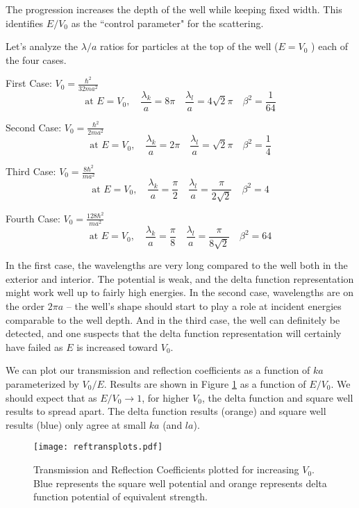 The progression increases the depth of the well while keeping fixed width. This
identifies $E/V_0$ as the ``control parameter" for the scattering. 

Let's analyze the $\lambda / a$ ratios for particles at the top of the well ($E
= V_0$ ) each of the four cases. 

\begin{subbox}{}
  First Case: $V_0 = \frac{\hbar^2}{32ma^2}$ 
  \[ \text{at } E = V_0, \quad \frac{\lambda_k}{a} = 8\pi \quad
  \frac{\lambda_l}{a} = 4\sqrt{2}\pi \quad \beta^2 = \frac{1}{64} \] 
  
  Second Case: $V_0 = \frac{\hbar^2}{2ma^2}$ 
  \[ \text{at } E = V_0, \quad \frac{\lambda_k}{a} = 2\pi \quad
    \frac{\lambda_l}{a} = \sqrt{2}\pi \quad \beta^2 = \frac{1}{4} \]

  Third Case: $V_0 = \frac{8\hbar^2}{ma^2}$
  \[ \text{at } E = V_0, \quad \frac{\lambda_k}{a} = \frac{\pi}{2} \quad
  \frac{\lambda_l}{a} = \frac{\pi}{2\sqrt{2}} \quad \beta^2 = 4 \] 

  Fourth Case: $V_0 = \frac{128\hbar^2}{ma^2}$ 
  \[ \text{at } E = V_0, \quad \frac{\lambda_k}{a} = \frac{\pi}{8} \quad
  \frac{\lambda_l}{a} = \frac{\pi}{8\sqrt{2}} \quad \beta^2 = 64\]
\end{subbox}


In the first case, the wavelengths are very long compared to the well both in
the exterior and interior. The potential is weak, and the delta function
representation might work well up to fairly high energies. In the second case,
wavelengths are on the order $2\pi a$ -- the well's shape should start to play
a role at incident energies comparable to the well depth. And in the third
case, the well can definitely be detected, and one suspects that the delta
function representation will certainly have failed as $E$ is increased toward
$V_0$. 

We can plot our transmission and reflection coefficients as a function of $ka$
parameterized by $V_0 / E$. Results are shown in Figure \ref{reftransplots} as
a function of $E / V_0$. We should expect that as $E / V_0 \rightarrow 1$, for
higher $V_0$, the delta function and square well results to spread apart. The
delta function results (orange) and square well results (blue) only agree at
small $ka$ (and $la$). 
\begin{figure}[H]
  \centering
    \texttt{[image: reftransplots.pdf]}
    \caption{Transmission and Reflection Coefficients plotted for increasing
      $V_0$. Blue represents the square well potential and orange represents
    delta function potential of equivalent strength.}
    \label{reftransplots}
\end{figure}

